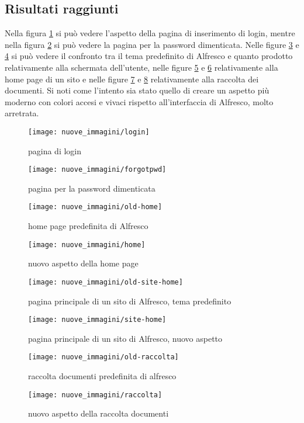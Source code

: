 \subsection{Risultati raggiunti}
Nella figura \ref{fig:login} si può vedere l'aspetto della pagina di inserimento di login, mentre nella figura \ref{fig:forgotpwd} si può vedere la pagina per la password dimenticata. Nelle figure \ref{fig:old-home} e \ref{fig:home} si può vedere il confronto tra il tema predefinito di Alfresco e quanto prodotto relativamente alla schermata dell'utente, nelle figure \ref{fig:old-site-home} e \ref{fig:site-home} relativamente alla home page di un sito e nelle figure \ref{fig:old-raccolta} e \ref{fig:raccolta} relativamente alla raccolta dei documenti. Si noti come l'intento sia stato quello di creare un aspetto più moderno con colori accesi e vivaci rispetto all'interfaccia di Alfresco, molto arretrata.
\begin{figure}[!ht]
\centering
\texttt{[image: nuove\_immagini/login]}
\caption{pagina di login\label{fig:login}}
\end{figure}
\begin{figure}[!ht]
\centering
\texttt{[image: nuove\_immagini/forgotpwd]}
\caption{pagina per la password dimenticata\label{fig:forgotpwd}}
\end{figure}
\begin{figure}[!ht]
\centering
\texttt{[image: nuove\_immagini/old-home]}
\caption{home page predefinita di Alfresco \label{fig:old-home}}
\end{figure}
\begin{figure}[!ht]
\centering
\texttt{[image: nuove\_immagini/home]}
\caption{nuovo aspetto della home page \label{fig:home}}
\end{figure}
\begin{figure}[!ht]
\centering
\texttt{[image: nuove\_immagini/old-site-home]}
\caption{pagina principale di un sito di Alfresco, tema predefinito \label{fig:old-site-home}}
\end{figure}
\begin{figure}[!ht]
\centering
\texttt{[image: nuove\_immagini/site-home]}
\caption{pagina principale di un sito di Alfresco, nuovo aspetto \label{fig:site-home}}
\end{figure}
\begin{figure}[!ht]
\centering
\texttt{[image: nuove\_immagini/old-raccolta]}
\caption{raccolta documenti predefinita di alfresco \label{fig:old-raccolta}}
\end{figure}
\begin{figure}[!ht]
\centering
\texttt{[image: nuove\_immagini/raccolta]}
\caption{nuovo aspetto della raccolta documenti \label{fig:raccolta}}
\end{figure}
